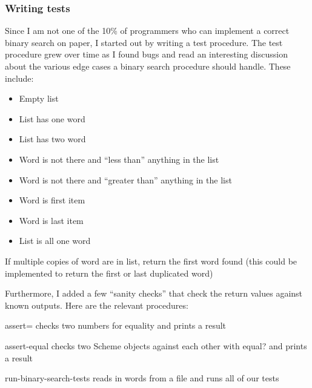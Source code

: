 \documentclass[12pt,openright,draft]{book}
\begin{document}
\subsubsection{Writing tests}

Since I am not one of the 10\% of programmers who can implement a
correct binary search on paper, I started out by writing a test
procedure. The test procedure grew over time as I found bugs and read
an interesting discussion about the various edge cases a binary search
procedure should handle. These include:

\begin{itemize}
\item Empty list 
\item List has one word 
\item List has two word 
\item Word is not there and ``less than'' anything in the list 
\item Word is not there and ``greater than'' anything in the list 
\item Word is first item 
\item Word is last item 
\item List is all one word 
\end{itemize}

If multiple copies of word are in list, return the first word found
(this could be implemented to return the first or last duplicated
word)

Furthermore, I added a few ``sanity checks'' that check the return
values against known outputs. Here are the relevant procedures:

assert= checks two numbers for equality and prints a result

assert-equal checks two Scheme objects against each other with equal?
and prints a result

run-binary-search-tests reads in words from a file and runs all of our
tests
\end{document}
